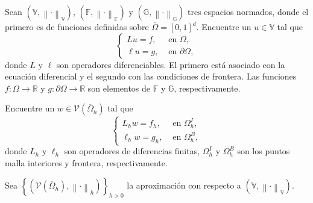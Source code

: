 Sean
\begin{math}
	\left(
	\mathbb{V},
	{\left\|\cdot\right\|}_{\mathbb{V}}
	\right)
\end{math},
\begin{math}
	\left(
	\mathbb{F},
	{\left\|\cdot\right\|}_{\mathbb{F}}
	\right)
\end{math}
y
\begin{math}
	\left(
	\mathbb{G},
	{\left\|\cdot\right\|}_{\mathbb{G}}
	\right)
\end{math}
tres espacios normados, donde el primero es de funciones definidas
sobre $\overline{\Omega}={\left[0,1\right]}^{d}$.
Encuentre un $u\in\mathbb{V}$ tal que
\begin{equation}\label{eq:boundary_value_problem}
	\begin{cases}
		Lu=f,     & \text{ en }\Omega,         \\
		\ell u=g, & \text{ en }\partial\Omega,
	\end{cases}
\end{equation}
donde $L$ y $\ell$ son operadores diferenciables.
El primero está asociado con la ecuación diferencial y el segundo con
las condiciones de frontera.
Las funciones $f\colon\Omega\to\mathbb{R}$ y
$g\colon\partial\Omega\to\mathbb{R}$
son elementos de $\mathbb{F}$ y $\mathbb{G}$, respectivamente.

Encuentre un $w\in\mathcal{V}\left(\overline{\Omega}_{h}\right)$ tal
que
\begin{equation}\label{eq:boundary_value_problem_finite}
	\begin{cases}
		L_{h}w=f_{h},    & \text{ en }\Omega^{I}_{h}, \\
		\ell_{h}w=g_{h}, & \text{ en }\Omega^{B}_{h},
	\end{cases}
\end{equation}
donde $L_{h}$ y $\ell_{h}$ son operadores de diferencias finitas,
\begin{math}
	\Omega^{I}_{h}
\end{math}
y
\begin{math}
	\Omega^{B}_{h}
\end{math}
son los puntos malla interiores y frontera, respectivamente.

Sea
\begin{math}
	\left\{
	\left(
	\mathcal{V}\left(\overline{\Omega}_{h}\right),
	\left\|\cdot\right\|_{h}
	\right)
	\right\}_{h>0}
\end{math}
la aproximación con respecto a
\begin{math}
	\left(
	\mathbb{V},
	{\left\|\cdot\right\|}_{\mathbb{V}}
	\right)
\end{math}.

